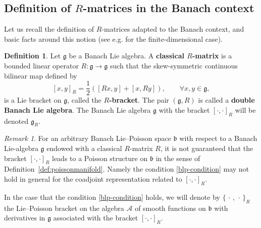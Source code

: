 \documentclass[a4paper,12pt,reqno]{amsart}%
\theoremstyle{definition}
\newtheorem{definition}[theorem]{Definition}
\theoremstyle{remark}
\newtheorem{remark}[theorem]{Remark}
\numberwithin{theorem}{section}
\numberwithin{equation}{section}
\newcommand{\1}{{\bf 1}}
\newcommand{\pb}{\{\,\cdot\,,\,\cdot\,\}}
\newcommand{\g}{{\mathfrak g}}
\newcommand{\bg}{{\mathfrak b}}
\begin{document}
\subsection{Definition of \texorpdfstring{$R$}{R}-matrices in the Banach context}
Let us recall the definition of $R$-matrices adapted to the Banach context, and basic facts around this notion (see e.g. \cite{belavin82,semenov83,kosmann88,adler} for the finite-dimensional case).


\begin{definition}\label{def:R}
Let $\mathfrak{g}$ be a Banach Lie algebra. A \textbf{classical $R$-matrix} is a bounded linear operator $R:\mathfrak{g}\rightarrow \mathfrak{g}$ such that 
the skew-symmetric continuous bilinear map defined by
\begin{equation}\label{R}
[x, y]_{R} = \frac{1}{2}\left([Rx, y] + [x, Ry]\right),\quad\quad \forall x, y\in\mathfrak{g},
\end{equation}
is a Lie bracket on $\mathfrak{g}$, called  the \textbf{$R$-bracket}. 
The pair $(\mathfrak g, R)$ is called a \textbf{double Banach Lie algebra}. The Banach Lie algebra $\g$ with the bracket $[\cdot,\cdot]_R$ will be denoted $\g_R$.
\end{definition}

\begin{remark}
    For an arbitrary Banach Lie--Poisson space $\bg$ with respect to a Banach Lie-algebra $\g$ endowed with a classical $R$-matrix $R$, it is not guaranteed that the bracket $[\cdot,\cdot]_R$  leads to a Poisson structure on $\bg$ in the sense of Definition~\ref{def:poissonmanifold}. Namely the condition \eqref{blp-condition} may not hold in general for the coadjoint representation related to $[\cdot,\cdot]_R$.

    In the case that the condition \eqref{blp-condition} holds, we will denote by $\pb_R$ the Lie--Poisson bracket on the algebra $\mathcal{A}$ of smooth functions on $\bg$ with derivatives in $\g$ associated with the bracket $[\cdot, \cdot]_R$.
\end{remark}
\end{document}
